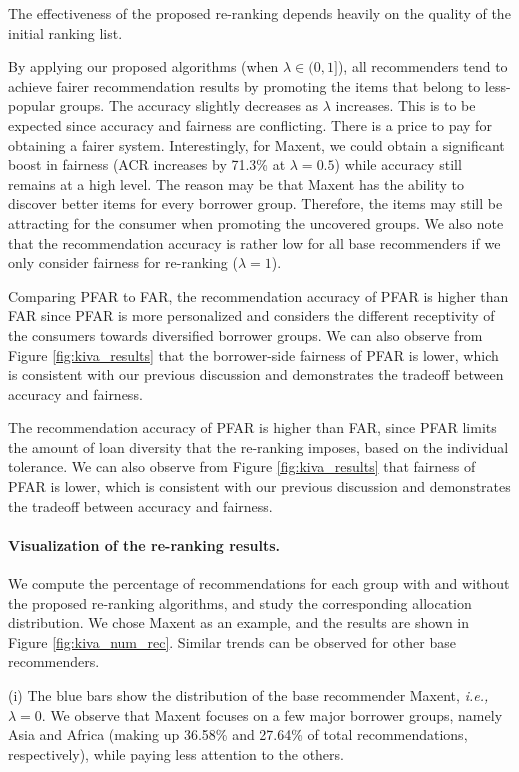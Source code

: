 The effectiveness of the proposed re-ranking depends heavily on the quality of the initial ranking list.

By applying our proposed algorithms (when $\lambda\in(0,1]$), all recommenders tend to achieve fairer recommendation results by promoting the items that belong to less-popular groups. The accuracy slightly decreases as $\lambda$ increases. This is to be expected since accuracy and fairness are conflicting. There is a price to pay for obtaining a fairer system. Interestingly, for Maxent, we could obtain a significant boost in fairness (ACR increases by 71.3\% at $\lambda=0.5$) while accuracy still remains at a high level. The reason may be that Maxent has the ability to discover better items for every borrower group. Therefore, the items may still be attracting for the consumer when promoting the uncovered groups. We also note that the recommendation accuracy is rather low for all base recommenders if we only consider fairness for re-ranking ($\lambda=1$).

Comparing PFAR to FAR, the recommendation accuracy of PFAR is higher than FAR since PFAR is more personalized and considers the different receptivity of the consumers towards diversified borrower groups. We can also observe from Figure \ref{fig:kiva_results} that the borrower-side fairness of PFAR is lower, which is consistent with our previous discussion and demonstrates the tradeoff between accuracy and fairness.

The recommendation accuracy of PFAR is higher than FAR, since PFAR limits the amount of loan diversity that the re-ranking imposes, based on the individual tolerance. We can also observe from Figure \ref{fig:kiva_results} that fairness of PFAR is lower, which is consistent with our previous discussion and demonstrates the tradeoff between accuracy and fairness.


\paragraph{Visualization of the re-ranking results.} We compute the percentage of recommendations for each group with and without the proposed re-ranking algorithms, and study the corresponding allocation distribution. We chose Maxent as an example, and the results are shown in Figure \ref{fig:kiva_num_rec}. Similar trends can be observed for other base recommenders.

(i) The blue bars show the distribution of the base recommender Maxent, \emph{i.e.,} $\lambda=0$. We observe that Maxent focuses on a few major borrower groups, namely Asia and Africa (making up 36.58\% and 27.64\% of total recommendations, respectively), while paying less attention to the others. 


